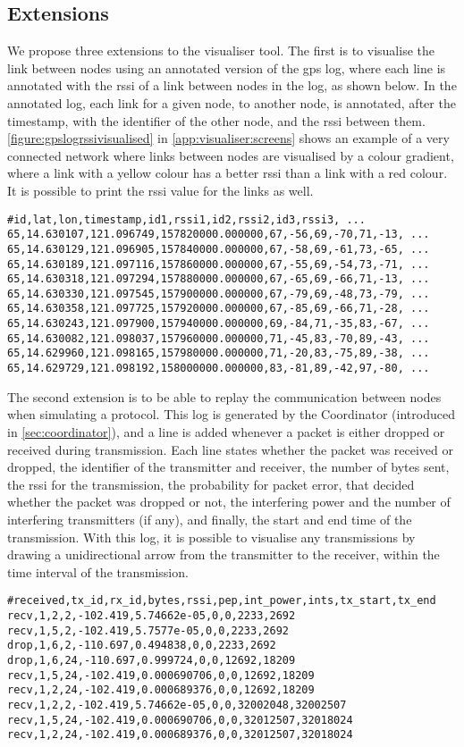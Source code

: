 \subsection{Extensions}
We propose three extensions to the visualiser tool. The first is to visualise the link between nodes using an
annotated version of the \acrshort{gps} log, where each line is annotated with the \gls{rssi} of a link
between nodes in the log, as shown below. In the annotated log, each link for a given node, to another node,
is annotated, after the timestamp, with the identifier of the other node, and the \gls{rssi} between them.
\autoref{figure:gpslogrssivisualised} in \autoref{app:visualiser:screens} shows an example of a very connected
network where links between nodes are visualised by a colour gradient, where a link with a yellow colour has a
better \gls{rssi} than a link with a red colour. It is possible to print the \gls{rssi} value for the links as
well.
%
\begin{verbatim}
#id,lat,lon,timestamp,id1,rssi1,id2,rssi2,id3,rssi3, ...
65,14.630107,121.096749,157820000.000000,67,-56,69,-70,71,-13, ...
65,14.630129,121.096905,157840000.000000,67,-58,69,-61,73,-65, ...
65,14.630189,121.097116,157860000.000000,67,-55,69,-54,73,-71, ...
65,14.630318,121.097294,157880000.000000,67,-65,69,-66,71,-13, ...
65,14.630330,121.097545,157900000.000000,67,-79,69,-48,73,-79, ...
65,14.630358,121.097725,157920000.000000,67,-85,69,-66,71,-28, ...
65,14.630243,121.097900,157940000.000000,69,-84,71,-35,83,-67, ...
65,14.630082,121.098037,157960000.000000,71,-45,83,-70,89,-43, ...
65,14.629960,121.098165,157980000.000000,71,-20,83,-75,89,-38, ...
65,14.629729,121.098192,158000000.000000,83,-81,89,-42,97,-80, ...
\end{verbatim}

The second extension is to be able to replay the communication between nodes when simulating a protocol. This
log is generated by the Coordinator (introduced in \autoref{sec:coordinator}), and a line is added whenever a
packet is either dropped or received during transmission. Each line states whether the packet was received
or dropped, the identifier of the transmitter and receiver, the number of bytes sent, the \gls{rssi} for the
transmission, the probability for packet error, that decided whether the packet was dropped or not, the
interfering power and the number of interfering transmitters (if any), and finally, the start and end time of
the transmission. With this log, it is possible to visualise any transmissions by drawing a unidirectional
arrow from the transmitter to the receiver, within the time interval of the transmission.
%
\begin{verbatim}
#received,tx_id,rx_id,bytes,rssi,pep,int_power,ints,tx_start,tx_end
recv,1,2,2,-102.419,5.74662e-05,0,0,2233,2692
recv,1,5,2,-102.419,5.7577e-05,0,0,2233,2692
drop,1,6,2,-110.697,0.494838,0,0,2233,2692
drop,1,6,24,-110.697,0.999724,0,0,12692,18209
recv,1,5,24,-102.419,0.000690706,0,0,12692,18209
recv,1,2,24,-102.419,0.000689376,0,0,12692,18209
recv,1,2,2,-102.419,5.74662e-05,0,0,32002048,32002507
recv,1,5,24,-102.419,0.000690706,0,0,32012507,32018024
recv,1,2,24,-102.419,0.000689376,0,0,32012507,32018024
\end{verbatim}

